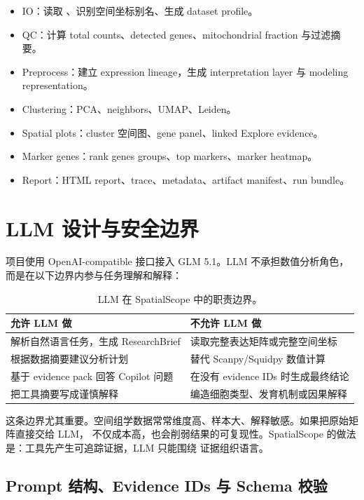 \documentclass[11pt,a4paper]{article}
\newcommand{\code}[1]{\texttt{\detokenize{#1}}}
\begin{document}
\begin{itemize}
  \item IO：读取 \code{.h5ad}、识别空间坐标别名、生成 dataset profile。
  \item QC：计算 total counts、detected genes、mitochondrial fraction 与过滤摘要。
  \item Preprocess：建立 expression lineage，生成 interpretation layer 与 modeling representation。
  \item Clustering：PCA、neighbors、UMAP、Leiden。
  \item Spatial plots：cluster 空间图、gene panel、linked Explore evidence。
  \item Marker genes：rank genes groups、top markers、marker heatmap。
  \item Report：HTML report、trace、metadata、artifact manifest、run bundle。
\end{itemize}

\section{LLM 设计与安全边界}

项目使用 OpenAI-compatible 接口接入 GLM 5.1。LLM 不承担数值分析角色，而是在以下边界内参与任务理解和解释：

\begin{table}[H]
\centering
\caption{LLM 在 SpatialScope 中的职责边界。}
\begin{tabularx}{\textwidth}{L{0.22\textwidth}Y}
\toprule
允许 LLM 做 & 不允许 LLM 做 \\
\midrule
解析自然语言任务，生成 ResearchBrief & 读取完整表达矩阵或完整空间坐标 \\
根据数据摘要建议分析计划 & 替代 Scanpy/Squidpy 数值计算 \\
基于 evidence pack 回答 Copilot 问题 & 在没有 evidence IDs 时生成最终结论 \\
把工具摘要写成谨慎解释 & 编造细胞类型、发育机制或因果解释 \\
\bottomrule
\end{tabularx}
\end{table}

这条边界尤其重要。空间组学数据常常维度高、样本大、解释敏感。如果把原始矩阵直接交给 LLM，
不仅成本高，也会削弱结果的可复现性。SpatialScope 的做法是：工具先产生可追踪证据，LLM 只能围绕
证据组织语言。

\subsection{Prompt 结构、Evidence IDs 与 Schema 校验}
\end{document}
